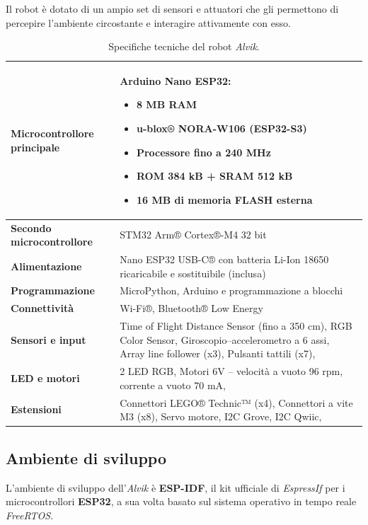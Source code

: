 Il robot è dotato di un ampio set di sensori e attuatori che gli permettono di percepire l'ambiente circostante e interagire attivamente con esso.
\pagebreak
\begin{table}[h!]
\centering
\renewcommand{\arraystretch}{1.2}
\begin{tabular}{|p{4cm}|p{9cm}|}
\hline
\textbf{Microcontrollore principale} &
Arduino Nano ESP32: 
\begin{itemize}
  \item 8 MB RAM
  \item u-blox® NORA-W106 (ESP32-S3)
  \item Processore fino a 240 MHz
  \item ROM 384 kB + SRAM 512 kB
  \item 16 MB di memoria FLASH esterna
\end{itemize} \\ \hline

\textbf{Secondo microcontrollore} & STM32 Arm® Cortex®-M4 32 bit \\ \hline

\textbf{Alimentazione} & 
Nano ESP32 USB-C® con batteria Li-Ion 18650 ricaricabile e sostituibile (inclusa) \\ \hline

\textbf{Programmazione} & 
MicroPython, Arduino e programmazione a blocchi \\ \hline

\textbf{Connettività} & 
Wi-Fi®, Bluetooth® Low Energy \\ \hline

\textbf{Sensori e input} &
	Time of Flight Distance Sensor (fino a 350 cm),
	RGB Color Sensor,
	Giroscopio–accelerometro a 6 assi,
	Array line follower (x3),
	Pulsanti tattili (x7),
\\ \hline

\textbf{LED e motori} &
	2 LED RGB,
	Motori 6V – velocità a vuoto 96 rpm, corrente a vuoto 70 mA,
\\ \hline

\textbf{Estensioni} &
Connettori LEGO® Technic™ (x4),
Connettori a vite M3 (x8),
Servo motore,
I2C Grove,
I2C Qwiic,  \\ \hline
\end{tabular}
\caption{Specifiche tecniche del robot \textit{Alvik}.}
\label{tab:alvik-specs}
\end{table}

\subsection{Ambiente di sviluppo}
L'ambiente di sviluppo dell'\textit{Alvik} è \textbf{ESP-IDF}, il kit ufficiale di \textit{EspressIf} per i microcontrollori \textbf{ESP32},
a sua volta basato sul sistema operativo in tempo reale \textit{FreeRTOS}.

